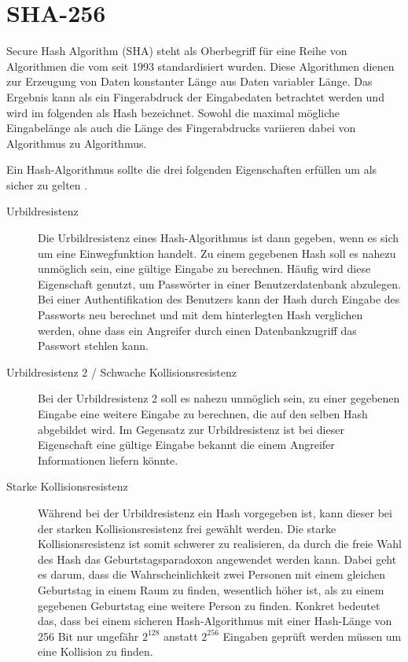 \chapter{SHA-256}
\label{chp:sha256}

Secure Hash Algorithm (SHA) steht als Oberbegriff für eine Reihe von Algorithmen die vom  seit 1993 standardisiert wurden.
Diese Algorithmen dienen zur Erzeugung von Daten konstanter Länge aus Daten variabler Länge.
Das Ergebnis kann als ein Fingerabdruck der Eingabedaten betrachtet werden und wird im folgenden als Hash bezeichnet.
Sowohl die maximal mögliche Eingabelänge als auch die Länge des Fingerabdrucks variieren dabei von Algorithmus zu Algorithmus.

Ein Hash-Algorithmus sollte die drei folgenden Eigenschaften erfüllen um als sicher zu gelten \cite{crypto1}.
\begin{description}
  \item[Urbildresistenz] Die Urbildresistenz eines Hash-Algorithmus ist dann gegeben, wenn es sich um eine Einwegfunktion handelt.
                         Zu einem gegebenen Hash soll es nahezu unmöglich sein, eine gültige Eingabe zu berechnen.
                         Häufig wird diese Eigenschaft genutzt, um Passwörter in einer Benutzerdatenbank abzulegen.
                         Bei einer Authentifikation des Benutzers kann der Hash durch Eingabe des Passworts neu berechnet und mit dem 
                         hinterlegten Hash verglichen werden, ohne dass ein Angreifer durch einen Datenbankzugriff das Passwort stehlen kann.
  \item[Urbildresistenz 2 / Schwache Kollisionsresistenz]
                         Bei der Urbildresistenz 2 soll es nahezu unmöglich sein, zu einer gegebenen Eingabe eine weitere Eingabe zu berechnen,
                         die auf den selben Hash abgebildet wird. Im Gegensatz zur Urbildresistenz ist bei dieser Eigenschaft eine gültige
                         Eingabe bekannt die einem Angreifer Informationen liefern könnte.
  \item[Starke Kollisionsresistenz]
                         Während bei der Urbildresistenz ein Hash vorgegeben ist, kann dieser bei der starken Kollisionsresistenz frei gewählt werden.
                         Die starke Kollisionsresistenz ist somit schwerer zu realisieren, da durch die freie Wahl des Hash das Geburtstagsparadoxon
                         angewendet werden kann. Dabei geht es darum, dass die Wahrscheinlichkeit zwei Personen mit einem gleichen Geburtstag in einem Raum
                         zu finden, wesentlich höher ist, als zu einem gegebenen Geburtstag eine weitere Person zu finden. Konkret bedeutet das, dass
                         bei einem sicheren Hash-Algorithmus mit einer Hash-Länge von 256 Bit nur ungefähr $ 2^{128} $ anstatt $ 2^{256} $ Eingaben geprüft werden
                         müssen um eine Kollision zu finden.                         
\end{description}

